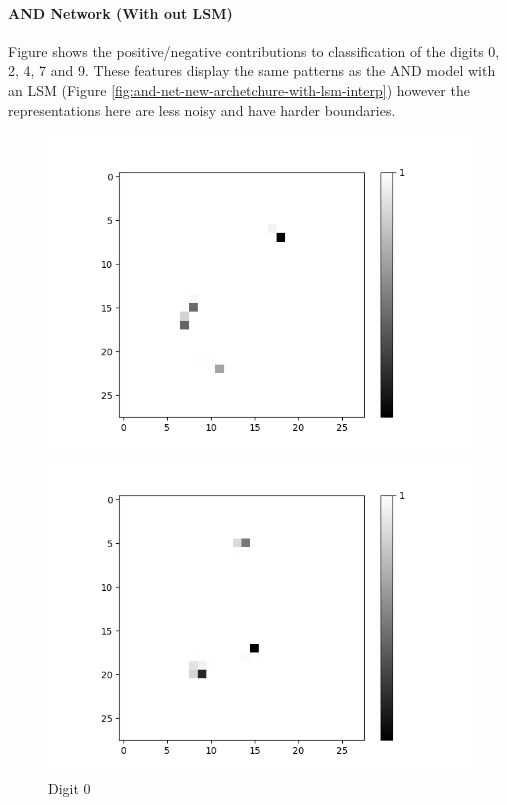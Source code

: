 \paragraph{AND Network (With out LSM)}
Figure {} shows the positive/negative contributions to classification of the digits 0, 2, 4, 7 and 9. These features display the same patterns as the AND model with an LSM (Figure \ref{fig:and-net-new-archetchure-with-lsm-interp}) however the representations here are less noisy and have harder boundaries.

\begin{figure}[H]
	\centering
	\begin{minipage}[b]{0.19\textwidth}
		\captionsetup{labelformat=empty}
		\includegraphics[width=\textwidth]{AND(NO-LSM)/Positive/Layer0-Neuron-0.png}
		\caption{Digit 0}
		\label{fig:cnf-descrete-generalizatiion}
	\end{minipage}
	\begin{minipage}[b]{0.19\textwidth}
		\captionsetup{labelformat=empty}
		\includegraphics[width=\textwidth]{AND(NO-LSM)/Positive/Layer0-Neuron-2.png}

\end{minipage}
\end{figure}
